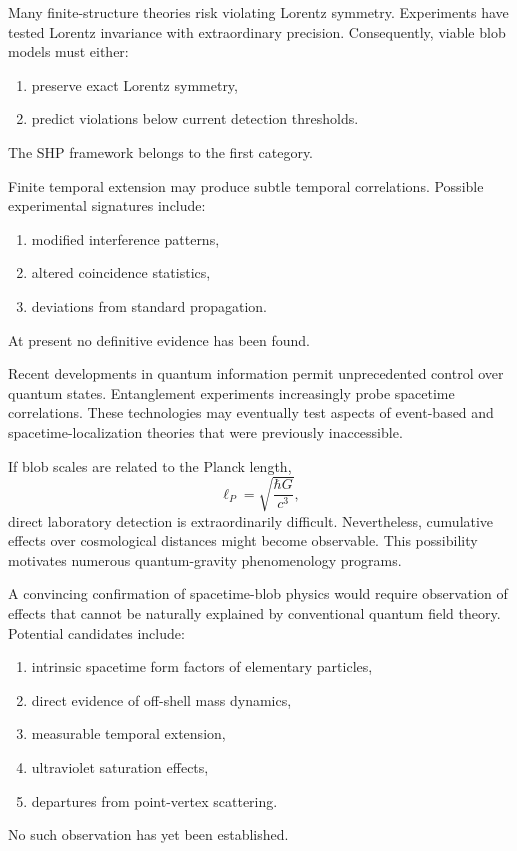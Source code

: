 Many finite-structure theories risk violating Lorentz symmetry.
Experiments have tested Lorentz invariance with extraordinary precision.
Consequently, viable blob models must either:
\begin{enumerate}
\item preserve exact Lorentz symmetry,
\item predict violations below current detection thresholds.
\end{enumerate}
The SHP framework belongs to the first category.

Finite temporal extension may produce subtle temporal correlations.
Possible experimental signatures include:
\begin{enumerate}
\item modified interference patterns,
\item altered coincidence statistics,
\item deviations from standard propagation.
\end{enumerate}
At present no definitive evidence has been found.

Recent developments in quantum information permit unprecedented control 
over quantum states.
Entanglement experiments increasingly probe spacetime correlations.
These technologies may eventually test aspects of event-based and 
spacetime-localization theories that were previously inaccessible.

If blob scales are related to the Planck length,
\[\ell_P = \sqrt{\frac{\hbar G}{c^3}},\]
direct laboratory detection is extraordinarily difficult.
Nevertheless, cumulative effects over cosmological distances might become observable.
This possibility motivates numerous quantum-gravity phenomenology programs.

A convincing confirmation of spacetime-blob physics would require observation
of effects that cannot be naturally explained by conventional quantum 
field theory.
Potential candidates include:
\begin{enumerate}
\item intrinsic spacetime form factors of elementary particles,
\item direct evidence of off-shell mass dynamics,
\item measurable temporal extension,
\item ultraviolet saturation effects,
\item departures from point-vertex scattering.
\end{enumerate}
No such observation has yet been established.

